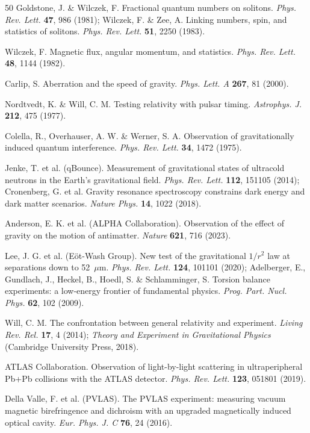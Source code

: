 \documentclass[11pt,a4paper]{article}
\begin{document}
\begin{thebibliography}{50}
 Goldstone, J. \& Wilczek, F. Fractional quantum numbers on solitons.
\emph{Phys. Rev. Lett.} \textbf{47}, 986 (1981); Wilczek, F. \& Zee, A. Linking numbers, spin,
and statistics of solitons. \emph{Phys. Rev. Lett.} \textbf{51}, 2250 (1983).

 Wilczek, F. Magnetic flux, angular momentum, and statistics.
\emph{Phys. Rev. Lett.} \textbf{48}, 1144 (1982).

 Carlip, S. Aberration and the speed of gravity. \emph{Phys. Lett. A}
\textbf{267}, 81 (2000).

 Nordtvedt, K. \& Will, C. M. Testing relativity with pulsar timing.
\emph{Astrophys. J.} \textbf{212}, 475 (1977).

 Colella, R., Overhauser, A. W. \& Werner, S. A. Observation of
gravitationally induced quantum interference. \emph{Phys. Rev. Lett.} \textbf{34}, 1472 (1975).

 Jenke, T. et al. (qBounce). Measurement of gravitational states of ultracold
neutrons in the Earth's gravitational field. \emph{Phys. Rev. Lett.} \textbf{112}, 151105 (2014);
Cronenberg, G. et al. Gravity resonance spectroscopy constrains dark energy and dark matter
scenarios. \emph{Nature Phys.} \textbf{14}, 1022 (2018).

 Anderson, E. K. et al. (ALPHA Collaboration). Observation of the effect of
gravity on the motion of antimatter. \emph{Nature} \textbf{621}, 716 (2023).

 Lee, J. G. et al. (E\"ot-Wash Group). New test of the gravitational $1/r^2$ law
at separations down to 52~$\mu$m. \emph{Phys. Rev. Lett.} \textbf{124}, 101101 (2020);
Adelberger, E., Gundlach, J., Heckel, B., Hoedl, S. \& Schlamminger, S. Torsion balance
experiments: a low-energy frontier of fundamental physics. \emph{Prog. Part. Nucl. Phys.}
\textbf{62}, 102 (2009).

 Will, C. M. The confrontation between general relativity and experiment.
\emph{Living Rev. Rel.} \textbf{17}, 4 (2014); \emph{Theory and Experiment in Gravitational
Physics} (Cambridge University Press, 2018).

 ATLAS Collaboration. Observation of light-by-light scattering in
ultraperipheral Pb+Pb collisions with the ATLAS detector. \emph{Phys. Rev. Lett.} \textbf{123},
051801 (2019).

 Della Valle, F. et al. (PVLAS). The PVLAS experiment: measuring vacuum
magnetic birefringence and dichroism with an upgraded magnetically induced optical cavity.
\emph{Eur. Phys. J. C} \textbf{76}, 24 (2016).


\end{thebibliography}
\end{document}
